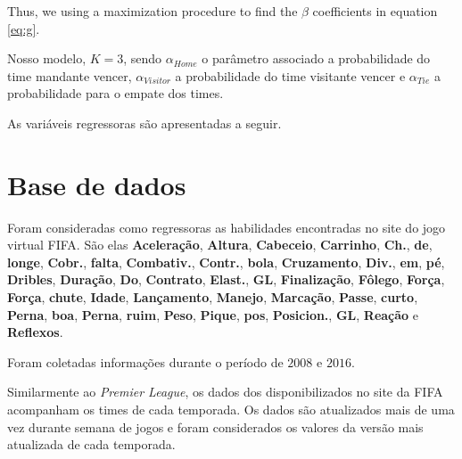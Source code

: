 \documentclass[review]{elsarticle}
\begin{document}
Thus, we using a maximization procedure to find the $\beta$ coefficients in equation \ref{eq:g}.

Nosso modelo, $K=3$, sendo $\alpha_{Home}$ o parâmetro associado a probabilidade do time mandante vencer, $\alpha_{Visitor}$ a probabilidade do time visitante vencer e $\alpha_{Tie}$ a probabilidade para o empate dos times.

As variáveis regressoras são apresentadas a seguir. 

\section{Base de dados}
\label{sec:data}


Foram consideradas como regressoras as habilidades encontradas no site do jogo virtual FIFA. São elas \textbf{Aceleração},  \textbf{Altura},  \textbf{Cabeceio},  \textbf{Carrinho},  \textbf{Ch.},  \textbf{de},  \textbf{longe},  \textbf{Cobr.},  \textbf{falta},  \textbf{Combativ.},  \textbf{Contr.},  \textbf{bola},  \textbf{Cruzamento},  \textbf{Div.},  \textbf{em},  \textbf{pé},  \textbf{Dribles},  \textbf{Duração},  \textbf{Do},  \textbf{Contrato},  \textbf{Elast.},  \textbf{GL},  \textbf{Finalização},  \textbf{Fôlego},  \textbf{Força},  \textbf{Força},  \textbf{chute},  \textbf{Idade},  \textbf{Lançamento},  \textbf{Manejo},  \textbf{Marcação},  \textbf{Passe},  \textbf{curto},  \textbf{Perna},  \textbf{boa},  \textbf{Perna},  \textbf{ruim},  \textbf{Peso},  \textbf{Pique},  \textbf{pos},  \textbf{Posicion.},  \textbf{GL},  \textbf{Reação} e  \textbf{Reflexos}.

Foram coletadas informações durante o período de $2008$ e $2016$.


Similarmente ao \textit{Premier League}, os dados dos disponibilizados no site da FIFA acompanham os times de cada temporada. Os dados são atualizados mais de uma vez durante semana de jogos e foram considerados os valores da versão mais atualizada de cada temporada.
\end{document}
